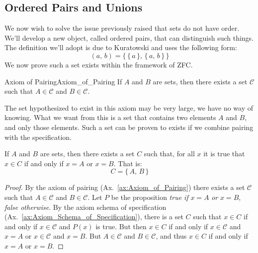     \subsection{Ordered Pairs and Unions}
        We now wish to solve the issue previously raised that sets do
        not have order. We'll develop a new object, called ordered pairs, that
        can distinguish such things. The definition we'll adopt is due to
        Kuratowski and uses the following form:
        \begin{equation}
            (a,\,b)=\Big\{\,\big\{\,a\,\big\},\,\big\{\,a,\,b\,\big\}\,\Big\}
        \end{equation}
        We now prove such a set exists within the framework of ZFC.
        \begin{faxiom}{Axiom of Pairing}{Axiom_of_Pairing}
            If $A$ and $B$ are sets, then there exists a set $\mathcal{C}$
            such that $A\in\mathcal{C}$ and $B\in\mathcal{C}$.
        \end{faxiom}
        The set hypothesized to exist in this axiom may be very large, we have
        no way of knowing. What we want from this is a set that contains two
        elements $A$ and $B$, and only those elements. Such a set can be proven
        to exists if we combine pairing with the specification.
        \begin{theorem}
            \label{thm:Existence_of_Set_Built_from_Two_Sets}%
            If $A$ and $B$ are sets, then there exists a set $C$ such that,
            for all $x$ it is true that $x\in{C}$ if and only if $x=A$ or
            $x=B$. That is:
            \begin{equation}
                C=\{\,A,\,B\,\}
            \end{equation}
        \end{theorem}
        \begin{proof}
            By the axiom of pairing (Ax.~\ref{ax:Axiom_of_Pairing}) there
            exists a set $\mathcal{C}$ such that $A\in\mathcal{C}$ and
            $B\in\mathcal{C}$. Let $P$ be the proposition
            \textit{true if} $x=A$ \textit{or} $x=B$, \textit{false otherwise}.
            By the axiom schema of specification
            (Ax.~\ref{ax:Axiom_Schema_of_Specification}), there is a set
            $C$ such that $x\in{C}$ if and only if $x\in\mathcal{C}$ and
            $P(x)$ is true. But then $x\in{C}$ if and only if
            $x\in\mathcal{C}$ and $x=A$ or $x\in\mathcal{C}$ and $x=B$.
            But $A\in\mathcal{C}$ and $B\in\mathcal{C}$, and thus
            $x\in{C}$ if and only if $x=A$ or $x=B$.
        \end{proof}
